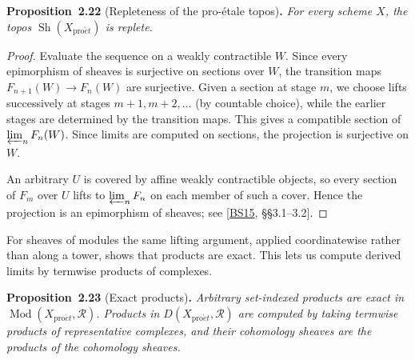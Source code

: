 \documentclass[11pt]{article}
\newenvironment{bpstatement}[2]{\par\addvspace{0.6\baselineskip}\noindent\textbf{#1}#2\textbf{.}\enspace\ignorespaces}
  {\par\addvspace{0.4\baselineskip}}
\newenvironment{bpstatementit}[2]{\begin{bpstatement}{#1}{#2}\itshape\ignorespaces}{\end{bpstatement}}
\providecommand{\Sh}{}\renewcommand{\Sh}{\operatorname{Sh}}
\begin{document}
\label{bp65}%
\begin{bpstatementit}{Proposition~2.22}{ (Repleteness of the pro-étale topos)}
For every scheme \(X\), the topos \(\Sh(X_{\mathrm{pro}\acute{e}t})\) is replete.
\end{bpstatementit}

\begin{proof}[{Proof}]\label{bp66}%
Evaluate the sequence on a weakly contractible \(W\). Since every epimorphism of sheaves is surjective on sections over \(W\), the transition maps \(F_{n+1}(W)\to F_n(W)\) are surjective. Given a section at stage \(m\), we choose lifts successively at stages \(m+1,m+2,\ldots\) (by countable choice), while the earlier stages are determined by the transition maps. This gives a compatible section of \(\varprojlim_nF_n(W)\). Since limits are computed on sections, the projection is surjective on \(W\).

An arbitrary \(U\) is covered by affine weakly contractible objects, so every section of \(F_m\) over \(U\) lifts to \(\varprojlim_nF_n\) on each member of such a cover. Hence the projection is an epimorphism of sheaves; see [\hyperref[bp705]{BS15}, §§3.1–3.2].
\end{proof}

\label{bp67}%
For sheaves of modules the same lifting argument, applied coordinatewise rather than along a tower, shows that products are exact. This lets us compute derived limits by termwise products of complexes.

\label{bp68}%
\begin{bpstatementit}{Proposition~2.23}{ (Exact products)}
Arbitrary set-indexed products are exact in \(\operatorname{Mod}(X_{\mathrm{pro}\acute{e}t},\mathcal R)\). Products in \(D(X_{\mathrm{pro}\acute{e}t},\mathcal R)\) are computed by taking termwise products of representative complexes, and their cohomology sheaves are the products of the cohomology sheaves.
\end{bpstatementit}
\end{document}
